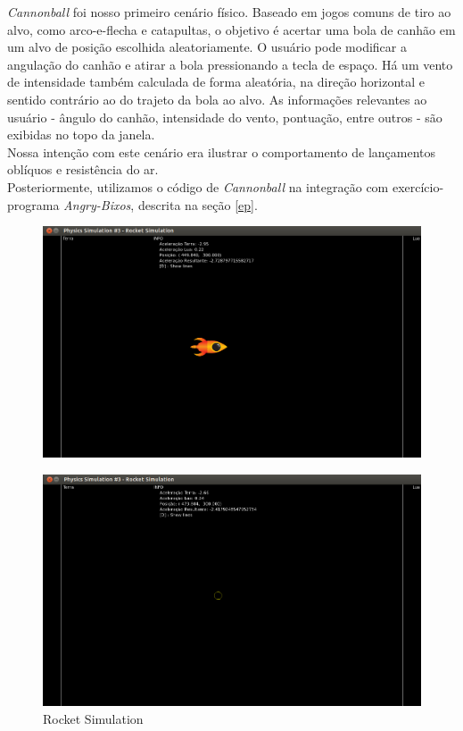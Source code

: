 \textit{Cannonball} foi nosso primeiro cenário físico. Baseado em jogos comuns de tiro ao alvo, como arco-e-flecha e catapultas, o objetivo é acertar uma bola de canhão em um alvo de posição escolhida aleatoriamente. O usuário pode modificar a angulação do canhão e atirar a bola pressionando a tecla de espaço. Há um vento de intensidade também calculada de forma aleatória, na direção horizontal e sentido contrário ao do trajeto da bola ao alvo. As informações relevantes ao usuário - ângulo do canhão, intensidade do vento, pontuação, entre outros - são exibidas no topo da janela. \\

Nossa intenção com este cenário era ilustrar o comportamento de lançamentos oblíquos e resistência do ar. \\

Posteriormente, utilizamos o código de \textit{Cannonball} na integração com exercício-programa \textit{Angry-Bixos}, descrita na seção \ref{ep}. \\

\newpage

\begin{figure}[H]
\centering
	\includegraphics[scale=0.3]{images/rocket-simulation.png}
\end{figure}

\begin{figure}[H]
\centering
	\includegraphics[scale=0.3]{images/rocket-simulationE.png}
	\caption{Rocket Simulation}
\end{figure}

